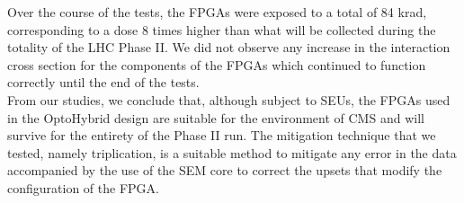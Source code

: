     Over the course of the tests, the FPGAs were exposed to a total of 84 krad, corresponding to a dose 8 times higher than what will be collected during the totality of the LHC Phase II. We did not observe any increase in the interaction cross section for the components of the FPGAs which continued to function correctly until the end of the tests. \\

    From our studies, we conclude that, although subject to SEUs, the FPGAs used in the OptoHybrid design are suitable for the environment of CMS and will survive for the entirety of the Phase II run. The mitigation technique that we tested, namely triplication, is a suitable method to mitigate any error in the data accompanied by the use of the SEM core to correct the upsets that modify the configuration of the FPGA.
